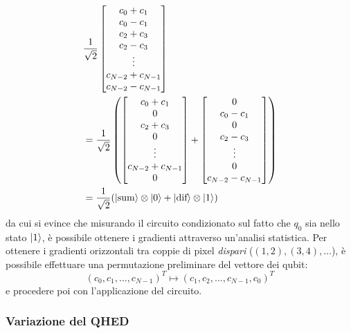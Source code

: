 \begin{align*}
	&\frac{1}{\sqrt 2} \begin{bmatrix}
	c_0+c_1\\ c_0-c_1\\ c_2+c_3\\ c_2-c_3\\ \vdots\\ c_{N-2}+c_{N-1}\\ c_{N-2}-c_{N-1}
\end{bmatrix}\\
	&=\frac{1}{\sqrt 2} 
\left(
\begin{bmatrix}
c_0+c_1\\ 0\\ c_2+c_3\\ 0\\ \vdots\\ c_{N-2}+c_{N-1}\\ 0
\end{bmatrix} + \begin{bmatrix}
0\\ c_0-c_1\\ 0\\ c_2-c_3\\ \vdots\\ 0\\ c_{N-2}-c_{N-1}
\end{bmatrix}
\right)\\
	&=\frac{1}{\sqrt 2} (\lvert\text{sum}\rangle \otimes \lvert0\rangle
		+ \lvert\text{dif}\rangle \otimes \lvert1\rangle)
\end{align*}
da cui si evince che misurando il circuito condizionato sul fatto che $q_0$ sia nello stato $\lvert1\rangle$, è possibile ottenere i gradienti attraverso un'analisi statistica. Per ottenere i gradienti orizzontali tra coppie di pixel \emph{dispari} ($(1,2), (3,4), \ldots$), è possibile effettuare una permutazione preliminare del vettore dei qubit:
\begin{equation}\label{eq:perm}
	(c_0, c_1, \ldots, c_{N-1})^T \mapsto (c_1, c_2, \ldots, c_{N-1}, c_0)^T
\end{equation}
e procedere poi con l'applicazione del circuito.

\subsubsection*{Variazione del QHED}

